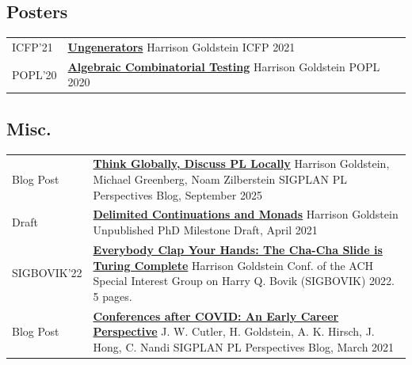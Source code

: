 \documentclass[a4paper]{article}
\newcommand{\semibf}{\fontseries{semibold}\selectfont}
\begin{document}
\subsection*{Posters}
\vspace{-5mm}
\begin{longtable}{@{}p{}p{}@{}}
  ICFP'21 &
    \href{https://harrisongoldste.in/papers/icfpsrc21.pdf}{\bf Ungenerators} \newline
    {\semibf Harrison Goldstein} \newline
    ICFP 2021
    \\
  POPL'20 &
    \href{https://harrisongoldste.in/papers/poplsrc20.pdf}{\bf Algebraic Combinatorial Testing} \newline
    {\semibf Harrison Goldstein} \newline
    POPL 2020
\end{longtable}

\subsection*{Misc.}
\vspace{-5mm}
\begin{longtable}{@{}p{}p{}@{}}
  Blog Post &
  \href{https://blog.sigplan.org/2025/09/16/think-globally-discuss-pl-locally/}{\bf
  Think Globally, Discuss PL Locally} \newline
    {\semibf Harrison Goldstein}, Michael Greenberg, Noam Zilberstein \newline
    SIGPLAN PL Perspectives Blog, September 2025
  \\
  Draft &
    \href{https://harrisongoldste.in/papers/drafts/wpe-ii.pdf}{\bf Delimited Continuations and Monads} \newline
    {\semibf Harrison Goldstein} \newline
    Unpublished PhD Milestone Draft, April 2021
  \\
  SIGBOVIK'22 &
    \href{https://harrisongoldste.in/papers/cha-cha-slide.pdf}{\bf Everybody
    Clap Your Hands: The Cha-Cha Slide is Turing Complete} \newline
    {\semibf Harrison Goldstein} \newline
    Conf. of the ACH Special Interest Group on Harry Q. Bovik (SIGBOVIK) 2022. 5 pages.
    \\
  Blog Post &
    \href{https://blog.sigplan.org/2021/03/25/conferences-after-covid-an-early-career-perspective/}{\bf Conferences after COVID: An Early Career Perspective} \newline
    J. W. Cutler, {\semibf H. Goldstein}, A. K. Hirsch, J. Hong, C. Nandi \newline
    SIGPLAN PL Perspectives Blog, March 2021
\end{longtable}
\end{document}
